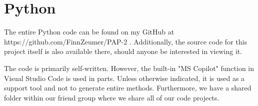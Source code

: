 \chapter{Python}
\label{ch:Python}


The entire Python code can be found on my GitHub at https://github.com/FinnZeumer/PAP-2 \cite{githubPAP2}. Additionally, the source code for this project itself is also available there, should anyone be interested in viewing it.

The code is primarily self-written. However, the built-in "MS Copilot" function in Visual Studio Code is used in parts. Unless otherwise indicated, it is used as a support tool and not to generate entire methods.
Furthermore, we have a shared folder within our friend group where we share all of our code projects.

